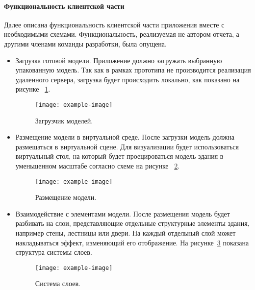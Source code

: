 \paragraph{Функциональность клиентской части}

Далее описана функциональность клиентской части приложения
вместе с необходимыми схемами.
Функциональность, реализуемая не автором отчета,
а другими членами команды разработки, была опущена.

\begin{itemize}
    \item {
        Загрузка готовой модели.
        Приложение должно загружать выбранную упакованную модель.
        Так как в рамках прототипа не производится реализация удаленного сервера,
        загрузка будет происходить локально, как показано на рисунке~%
        \ref{figure:CModelLoader}.

        \begin{figure}[ht]
            \centering
            \texttt{[image: example-image]}
            \caption{Загрузчик моделей.}
            \label{figure:CModelLoader}
        \end{figure}

    } 
    \item {
        Размещение модели в виртуальной среде.
        После загрузки модель должна размещаться в виртуальной сцене.
        Для визуализации будет использоваться виртуальный стол,
        на который будет проецироваться модель здания
        в уменьшенном масштабе согласно схеме на рисунке~%
        \ref{figure:CStand}.

        \begin{figure}[ht]
            \centering
            \texttt{[image: example-image]}
            \caption{Размещение модели.}
            \label{figure:CStand}
        \end{figure}

    } 
    \item {
        Взаимодействие с элементами модели.
        После размещения модель будет разбивать на слои,
        представляющие отдельные структурные элементы здания,
        например стены, лестницы или двери.
        На каждый отдельный слой может накладываться эффект,
        изменяющий его отображение.
        На рисунке~\ref{figure:CLayers} показана
        структура системы слоев.

        \begin{figure}[ht]
            \centering
            \texttt{[image: example-image]}
            \caption{Система слоев.}
            \label{figure:CLayers}
        \end{figure}

    } 
\end{itemize}

